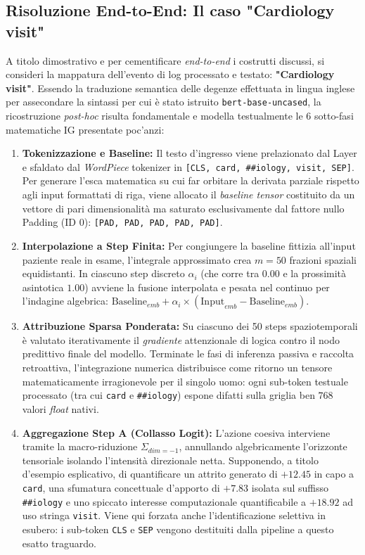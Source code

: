 \subsection{Risoluzione End-to-End: Il caso "Cardiology visit"}
A titolo dimostrativo e per cementificare \textit{end-to-end} i costrutti discussi, si consideri la mappatura dell'evento di log processato e testato: \textbf{"Cardiology visit"}. Essendo la traduzione semantica delle degenze effettuata in lingua inglese per assecondare la sintassi per cui è stato istruito \texttt{bert-base-uncased}, la ricostruzione \textit{post-hoc} risulta fondamentale e modella testualmente le 6 sotto-fasi matematiche IG presentate poc'anzi:

\begin{enumerate}
    \item \textbf{Tokenizzazione e Baseline:} Il testo d'ingresso viene prelazionato dal Layer e sfaldato dal \textit{WordPiece} tokenizer in \texttt{[CLS, card, \#\#iology, visit, SEP]}. Per generare l'esca matematica su cui far orbitare la derivata parziale rispetto agli input formattati di riga, viene allocato il \textit{baseline tensor} costituito da un vettore di pari dimensionalità ma saturato esclusivamente dal fattore nullo Padding (ID 0): \texttt{[PAD, PAD, PAD, PAD, PAD]}.
    \item \textbf{Interpolazione a Step Finita:} Per congiungere la baseline fittizia all'input paziente reale in esame, l'integrale approssimato crea $m=50$ frazioni spaziali equidistanti. In ciascuno step discreto $\alpha_i$ (che corre tra $0.00$ e la prossimità asintotica $1.00$) avviene la fusione interpolata e pesata nel continuo per l'indagine algebrica: $\text{Baseline}_{emb} + \alpha_i \times (\text{Input}_{emb} - \text{Baseline}_{emb})$.
    \item \textbf{Attribuzione Sparsa Ponderata:} Su ciascuno dei 50 steps spaziotemporali è valutato iterativamente il \textit{gradiente} attenzionale di logica contro il nodo predittivo finale del modello. Terminate le fasi di inferenza passiva e raccolta retroattiva, l'integrazione numerica distribuisce come ritorno un tensore matematicamente irragionevole per il singolo uomo: ogni sub-token testuale processato (tra cui \texttt{card} e \texttt{\#\#iology}) espone difatti sulla griglia ben $768$ valori \textit{float} nativi.
    \item \textbf{Aggregazione Step A (Collasso Logit):} L'azione coesiva interviene tramite la macro-riduzione $\Sigma_{dim=-1}$, annullando algebricamente l'orizzonte tensoriale isolando l'intensità direzionale netta. Supponendo, a titolo d'esempio esplicativo, di quantificare un attrito generato di $+12.45$ in capo a \texttt{card}, una sfumatura concettuale d'apporto di $+7.83$ isolata sul suffisso \texttt{\#\#iology} e uno spiccato interesse computazionale quantificabile a $+18.92$ ad uso stringa \texttt{visit}. Viene qui forzata anche l'identificazione selettiva in esubero: i sub-token \texttt{CLS} e \texttt{SEP} vengono destituiti dalla pipeline a questo esatto traguardo.

\end{enumerate}
